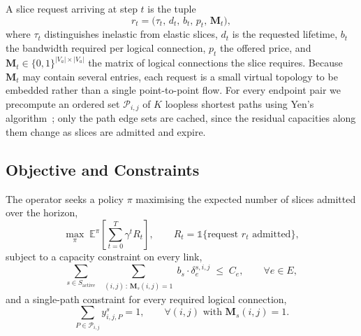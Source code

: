 \documentclass[10pt,journal,comsoc]{IEEEtran}
\begin{document}
A slice request arriving at step $t$ is the tuple
\begin{equation}
r_t = \bigl( \tau_t,\, d_t,\, b_t,\, p_t,\, \mathbf{M}_t \bigr),
\label{eq:request}
\end{equation}
where $\tau_t$ distinguishes inelastic from elastic slices, $d_t$ is the
requested lifetime, $b_t$ the bandwidth required per logical connection,
$p_t$ the offered price, and $\mathbf{M}_t \in \{0,1\}^{|V_a| \times
|V_a|}$ the matrix of logical connections the slice requires. Because
$\mathbf{M}_t$ may contain several entries, each request is a small
virtual topology to be embedded rather than a single point-to-point flow.
For every endpoint pair we precompute an ordered set $\mathcal{P}_{i,j}$
of $K$ loopless shortest paths using Yen's algorithm~\cite{yen1971finding};
only the path edge sets are cached, since the residual capacities along
them change as slices are admitted and expire.

\subsection{Objective and Constraints}
The operator seeks a policy $\pi$ maximising the expected number of
slices admitted over the horizon,
\begin{equation}
\label{eq:objective}
\max_{\pi} \; \mathbb{E}^{\pi}\!\left[ \sum_{t=0}^{T} \gamma^{t} R_t \right],
\qquad
R_t = \mathbb{1}\{\text{request } r_t \text{ admitted}\},
\end{equation}
subject to a capacity constraint on every link,
\begin{equation}
\label{eq:capacity}
\sum_{s \in S_{\text{active}}} \;
\sum_{\substack{(i,j)\, :\, \mathbf{M}_s(i,j)=1}}
b_s \cdot \delta^{s,i,j}_e \;\leq\; C_e,
\qquad \forall e \in E,
\end{equation}
and a single-path constraint for every required logical connection,
\begin{equation}
\label{eq:pathselection}
\sum_{P \in \mathcal{P}_{i,j}} y^{s}_{i,j,P} = 1,
\qquad \forall (i,j) \text{ with } \mathbf{M}_s(i,j)=1 .
\end{equation}
\end{document}
